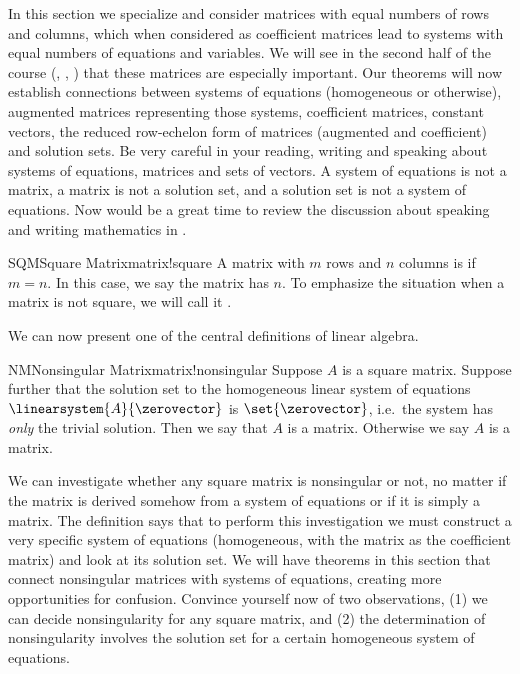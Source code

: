 %
In this section we specialize and consider matrices with equal numbers of rows and columns, which when considered as coefficient matrices lead to systems with equal numbers of equations and variables.  We will see in the second half of the course (,  , ) that these matrices are especially important.
%
%
Our theorems will now establish connections between systems of equations (homogeneous or otherwise), augmented matrices representing those systems, coefficient matrices, constant vectors, the reduced row-echelon form of matrices (augmented and coefficient) and solution sets.  Be very careful in your reading, writing and speaking about systems of equations, matrices and sets of vectors.  A system of equations is not a matrix, a matrix is not a solution set, and a solution set is not a system of equations.  Now would be a great time to review the discussion about speaking and writing mathematics in .
%
\begin{definition}{SQM}{Square Matrix}{matrix!square}
A matrix with $m$ rows and $n$ columns is  if $m=n$.  In this case, we say the matrix has  $n$.  To emphasize the situation when a matrix is not square, we will call it .
\end{definition}
%
We can now present one of the central definitions of linear algebra.
%
\begin{definition}{NM}{Nonsingular Matrix}{matrix!nonsingular}
Suppose $A$ is a square matrix.  Suppose further that the solution set to the homogeneous linear system of equations $\linearsystem{A}{\zerovector}$ is $\set{\zerovector}$, i.e.\ the system has {\em only} the trivial solution.  Then we say that $A$ is a  matrix.  Otherwise we say $A$ is a  matrix.
\end{definition}
%
We can investigate whether any square matrix is nonsingular or not, no matter if the matrix is derived somehow from a system of equations or if it is simply a matrix.  The definition says that to perform this investigation we must construct a very specific system of equations (homogeneous, with the matrix as the coefficient matrix) and look at its solution set.  We will have theorems in this section that connect nonsingular matrices with systems of equations, creating more opportunities for confusion.  Convince yourself now of two observations, (1) we can decide nonsingularity for any square matrix, and (2) the determination of nonsingularity involves the solution set for a certain homogeneous system of equations.\par
